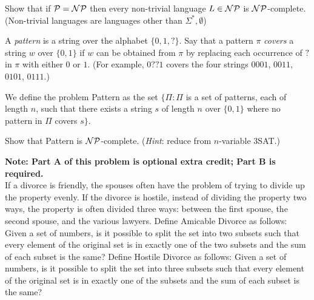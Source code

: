 \documentclass[solution, letterpaper]{cscie121}
\begin{document}

\newcommand{\PSPACE}{\mathrm{PSPACE}}
\newcommand{\NPSPACE}{\mathrm{NPSPACE}}
\newcommand{\AD}{\mathsc{Amicable Divorce}}
\newcommand{\HD}{\mathsc{Hostile Divorce}}
\renewcommand{\P}{\mathrm{P}}


Show that if ${\cal P} = {\cal NP}$ then every non-trivial language $L \in {\cal NP}$ is ${\cal NP}$-complete. (Non-trivial languages are languages other than $\Sigma^*, \emptyset$)

\begin{solution}
\end{solution}



A {\it pattern} is a string over the alphabet $\{0,1, ?\}$.  Say that
        a
        pattern $\pi$ {\it covers} a string $w$ over $\{0,1\}$ if
        $w$ can be obtained from $\pi$ by replacing each occurrence of
        $?$ in $\pi$ with either $0$ or $1$.  (For example, $0??1$ covers the
        four strings $0001$, $0011$, $0101$, $0111$.)

        We define the problem {\sc Pattern} as the set $\{\Pi : \Pi$ is a set
        of patterns, each of length $n$, such that there exists a string $s$
        of length
        $n$ over $\{0,1\}$ where no pattern in $\Pi$ covers $s\}$.

        Show that {\sc Pattern} is ${\cal NP}$-complete.  (\emph{Hint}:
        reduce from $n$-variable {\sc 3SAT}.)

\begin{solution}
\end{solution}

\textbf{Note: Part A of this problem is optional extra credit; Part B is required.}\\
If a divorce is friendly, the spouses often have the problem of trying to divide up the property evenly. If the divorce is hostile, instead of dividing the property two ways, the property is often divided three ways: between the first spouse, the second spouse, and the various lawyers. Define {\sc Amicable Divorce} as follows: Given a set of numbers, is it possible to split the set into two subsets such that every element of the original set is in exactly one of the two subsets and the sum of each subset is the same?
Define {\sc Hostile Divorce} as follows: Given a set of numbers, is it possible to split the set into three subsets such that every element of the original set is in exactly one of the subsets and the sum of each subset is the same? 
\end{document}

